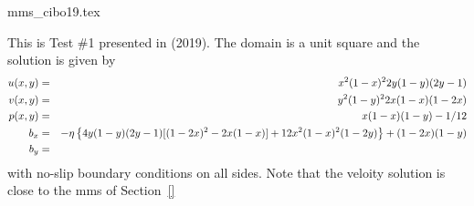 \begin{flushright} {\tiny {\color{gray} mms\_cibo19.tex}} \end{flushright}

This is Test \#1 presented in \textcite{cibo19} (2019). 
The domain is a unit square and the solution is given by
\begin{eqnarray}
u(x,y)&=& x^2(1-x)^2 2y(1-y)(2y-1) \nonumber\\
v(x,y)&=& y^2(1-y)^22x(1-x)(1-2x)  \nonumber\\
p(x,y)&=& x(1-x)(1-y)-1/12 \nonumber\\
b_x &=& -\eta \left\{ 4y (1-y)(2y - 1)[(1 - 2x)^2 - 2x(1-x)] 
+ 12x^2 (1 - x)^2 (1 - 2y) \right\} + (1 - 2x) (1 - y) \\
b_y &=& 
\end{eqnarray}
with no-slip boundary conditions on all sides.
Note that the veloity solution is close to the mms of Section~\ref{}



